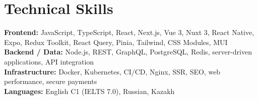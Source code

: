 \documentclass[letterpaper,10pt]{article}
\begin{document}
\section{Technical Skills}
\begin{itemize}[leftmargin=0in, label={}]
  \small{\item{
    \textbf{Frontend:} JavaScript, TypeScript, React, Next.js, Vue 3, Nuxt 3, React Native, Expo, Redux Toolkit, React Query, Pinia, Tailwind, CSS Modules, MUI \\
    \textbf{Backend / Data:} Node.js, REST, GraphQL, PostgreSQL, Redis, server-driven applications, API integration \\
    \textbf{Infrastructure:} Docker, Kubernetes, CI/CD, Nginx, SSR, SEO, web performance, secure payments \\
    \textbf{Languages:} English C1 (IELTS 7.0), Russian, Kazakh
  }}
\end{itemize}
\vspace{-13pt}
\end{document}
